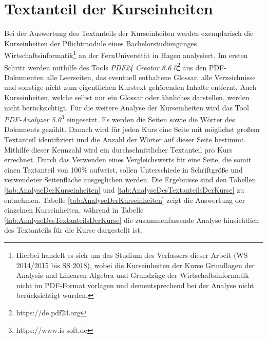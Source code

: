 \section{Textanteil der Kurseinheiten}
\label{sec:TextanteilDerKurseinheiten}
Bei der Auswertung des Textanteils der Kurseinheiten werden exemplarisch die Kurseinheiten der Pflichtmodule eines Bachelorstudienganges Wirtschaftsinformatik\footnote{Hierbei handelt es sich um das Studium des Verfassers dieser Arbeit (WS 2014/2015 bis SS 2018), wobei die Kurseinheiten der Kurse \glqq Grundlagen der Analysis und Linearen Algebra\grqq{} und \glqq Grundzüge der Wirtschaftsinformatik\grqq{} nicht im PDF-Format vorlagen und dementsprechend bei der Analyse nicht berücksichtigt wurden.} an der FernUniversität in Hagen analysiert. Im ersten Schritt werden mithilfe des Tools \textit{PDF24 Creator 8.6.0}\footnote{https://de.pdf24.org} aus den PDF-Dokumenten alle Leerseiten, das eventuell enthaltene Glossar, alle Verzeichnisse und sonstige nicht zum eigentlichen Kurstext gehörenden Inhalte entfernt. Auch Kurseinheiten, welche selbst nur ein Glossar oder ähnliches darstellen, werden nicht berücksichtigt. Für die weitere Analyse der Kurseinheiten wird das Tool \textit{PDF-Analyzer 5.0}\footnote{https://www.is-soft.de} eingesetzt. Es werden die Seiten sowie die Wörter des Dokuments gezählt. Danach wird für jeden Kurs eine Seite mit möglichst großem Textanteil identifiziert und die Anzahl der Wörter auf dieser Seite bestimmt. Mithilfe dieser Kennzahl wird ein durchschnittlicher Textanteil pro Kurs errechnet. Durch das Verwenden eines Vergleichswerts für eine Seite, die somit einen Textanteil von 100\% aufweist, sollen Unterschiede in Schriftgröße und verwendeter Seitenfläche ausgeglichen werden.
Die Ergebnisse sind den Tabellen \ref{tab:AnalyseDerKurseinheiten} und \ref{tab:AnalyseDesTextanteilsDerKurse} zu entnehmen. Tabelle \ref{tab:AnalyseDerKurseinheiten} zeigt die Auswertung der einzelnen Kurseinheiten, während in Tabelle \ref{tab:AnalyseDesTextanteilsDerKurse} die zusammenfassende Analyse hinsichtlich des Textanteils für die Kurse dargestellt ist.

